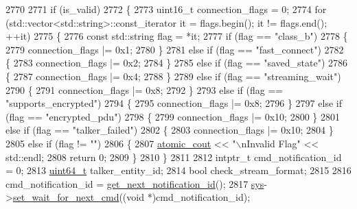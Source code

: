 \begin{DoxyCode}
2770 
2771     \textcolor{keywordflow}{if} (is\_valid)
2772     \{
2773         uint16\_t connection\_flags = 0;
2774         \textcolor{keywordflow}{for} (std::vector<std::string>::const\_iterator it = flags.begin(); it != flags.end(); ++it)
2775         \{
2776             \textcolor{keyword}{const} std::string flag = *it;
2777             \textcolor{keywordflow}{if} (flag == \textcolor{stringliteral}{"class\_b"})
2778             \{
2779                 connection\_flags |= 0x1;
2780             \}
2781             \textcolor{keywordflow}{else} \textcolor{keywordflow}{if} (flag == \textcolor{stringliteral}{"fast\_connect"})
2782             \{
2783                 connection\_flags |= 0x2;
2784             \}
2785             \textcolor{keywordflow}{else} \textcolor{keywordflow}{if} (flag == \textcolor{stringliteral}{"saved\_state"})
2786             \{
2787                 connection\_flags |= 0x4;
2788             \}
2789             \textcolor{keywordflow}{else} \textcolor{keywordflow}{if} (flag == \textcolor{stringliteral}{"streaming\_wait"})
2790             \{
2791                 connection\_flags |= 0x8;
2792             \}
2793             \textcolor{keywordflow}{else} \textcolor{keywordflow}{if} (flag == \textcolor{stringliteral}{"supports\_encrypted"})
2794             \{
2795                 connection\_flags |= 0x8;
2796             \}
2797             \textcolor{keywordflow}{else} \textcolor{keywordflow}{if} (flag == \textcolor{stringliteral}{"encrypted\_pdu"})
2798             \{
2799                 connection\_flags |= 0x10;
2800             \}
2801             \textcolor{keywordflow}{else} \textcolor{keywordflow}{if} (flag == \textcolor{stringliteral}{"talker\_failed"})
2802             \{
2803                 connection\_flags |= 0x10;
2804             \}
2805             \textcolor{keywordflow}{else} \textcolor{keywordflow}{if} (flag != \textcolor{stringliteral}{""})
2806             \{
2807                 \hyperlink{cmd__line_8h_a0bc38ccc65c79ba06c6fcd7b4bf554c3}{atomic\_cout} << \textcolor{stringliteral}{"\(\backslash\)nInvalid Flag"} << std::endl;
2808                 \textcolor{keywordflow}{return} 0;
2809             \}
2810         \}
2811 
2812         intptr\_t cmd\_notification\_id = 0;
2813         \hyperlink{parse_8c_aec6fcb673ff035718c238c8c9d544c47}{uint64\_t} talker\_entity\_id;
2814         \textcolor{keywordtype}{bool} check\_stream\_format;
2815 
2816         cmd\_notification\_id = \hyperlink{classcmd__line_a57486218387d1aa9d262eb7c176154ad}{get\_next\_notification\_id}();
2817         \hyperlink{classcmd__line_a485db4800e331cb4052c447fdf5d154e}{sys}->\hyperlink{classavdecc__lib_1_1system_a26b769584f10225077da47583edda33e}{set\_wait\_for\_next\_cmd}((\textcolor{keywordtype}{void} *)cmd\_notification\_id);

\end{DoxyCode}
